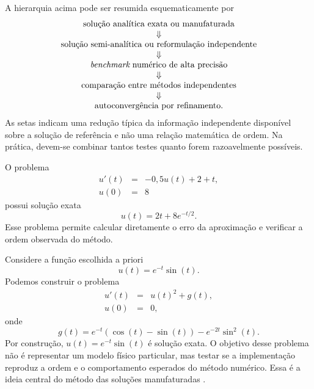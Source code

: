 A hierarquia acima pode ser resumida esquematicamente por
\begin{equation}
\begin{array}{c}
\hbox{solução analítica exata ou manufaturada}\\
\Downarrow\\
\hbox{solução semi-analítica ou reformulação independente}\\
\Downarrow\\
\hbox{{\it benchmark} numérico de alta precisão}\\
\Downarrow\\
\hbox{comparação entre métodos independentes}\\
\Downarrow\\
\hbox{autoconvergência por refinamento}.
\end{array}
\end{equation}
As setas indicam uma redução típica da informação independente disponível sobre a solução de referência e não uma relação matemática de ordem. Na prática, devem-se combinar tantos testes quanto forem razoavelmente possíveis.

\begin{ex}
O problema
\begin{eqnarray}
u'(t)&=&-0,5u(t)+2+t,\\
u(0)&=&8
\end{eqnarray}
possui solução exata
\begin{equation}
u(t)=2t+8e^{-t/2}.
\end{equation}
Esse problema permite calcular diretamente o erro da aproximação e verificar a ordem observada do método.
\end{ex}

\begin{ex}
Considere a função escolhida a priori
\begin{equation}
u(t)=e^{-t}\sin(t).
\end{equation}
Podemos construir o problema
\begin{eqnarray}
u'(t)&=&u(t)^2+g(t),\\
u(0)&=&0,
\end{eqnarray}
onde
\begin{equation}
g(t)=e^{-t}(\cos(t)-\sin(t))-e^{-2t}\sin^2(t).
\end{equation}
Por construção, $u(t)=e^{-t}\sin(t)$ é solução exata. O objetivo desse problema não é representar um modelo físico particular, mas testar se a implementação reproduz a ordem e o comportamento esperados do método numérico. Essa é a ideia central do método das soluções manufaturadas \cite{Roache2002MMS}.
\end{ex}


